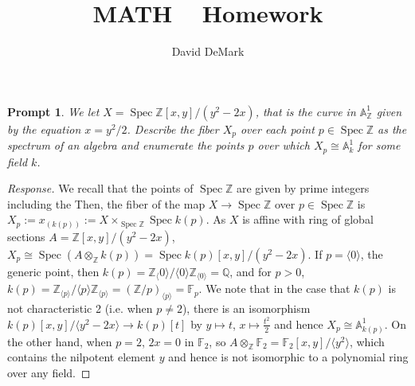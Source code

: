 \documentclass[english,letter,doublesided]{article}
\title{MATH \course~ Homework \Roman{hwn}}
\author{David DeMark}
\date{\due}
\DeclareMathOperator{\spec}{Spec}
\renewcommand{\AA}{\mathbb{A}}
\newcommand{\ZZ}{\mathbb{Z}}
\newcommand{\QQ}{\mathbb{Q}}
\newcommand{\FF}{\mathbb{F}}
\newcommand{\prob}[1]{\setcounter{section}{#1-1}\section{}}
\newtheorem*{prompt*}{Prompt}
\theoremstyle{remark}
\theoremstyle{definition}
\newcommand{\idl}[1]{\langle #1 \rangle}
\begin{document}
\maketitle

\prob{1}
\begin{prompt*}
	We let $X=\spec \ZZ[x,y]/(y^2-2x)$, that is the curve in $\AA_\ZZ^1$ given by the equation $x=y^2/2$. Describe the fiber $X_p$ over each point $p\in \spec \ZZ$ as the spectrum of an algebra and enumerate the points $p$ over which $X_p\cong\AA^1_k$ for some field $k$. 
\end{prompt*}
\begin{proof}[Response]
We recall that the points of $\spec \ZZ$ are given by prime integers including the  Then, the fiber of the map $X\to \spec \ZZ$ over $p\in \spec \ZZ$ is $X_p:=x_{(k(p))}:=X\times_{\spec \ZZ} \spec k(p)$. As $X$ is affine with ring of global sections $A=\ZZ[x,y]/(y^2-2x)$, $X_p\cong \spec \left(A\otimes_{\ZZ}k(p)\right)=\spec k(p)[x,y]/(y^2-2x)$. If $p=\idl{0}$, the generic point, then $k(p)=\ZZ_\idl{0}/\idl{0}\ZZ_{\idl{0}}=\QQ$, and for $p>0$, $k(p)=\ZZ_{\idl{p}}/\idl{p}\ZZ_{\idl{p}}=\left(\ZZ/p\right)_{\idl{p}}=\FF_p$. We note that in the case that $k(p)$ is not characteristic 2 (i.e. when $p\neq 2$), there is an isomorphism $k(p)[x,y]/\idl{y^2-2x}\to k(p)[t]$ by $y\mapsto t$, $x\mapsto \frac{t^2}{2}$ and hence $X_p\cong \AA^1_{k(p)}$. On the other hand, when $p=2$, $2x=0$ in $\FF_2$, so $A\otimes_\ZZ \FF_2=\FF_2[x,y]/\idl{y^2}$, which contains the nilpotent element $y$ and hence is not isomorphic to a polynomial ring over any field.
\end{proof}
\end{document}
